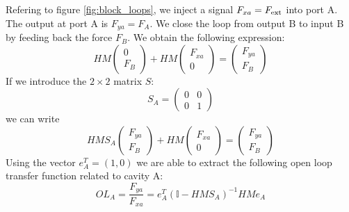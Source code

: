 Refering to figure \ref{fig:block_loops}, we inject a signal $F_{xa}=F_{\rm ext}$ into port A. The output at port A is $F_{ya}=F_A$. We close the loop from output B to input B by feeding back the force $F_B$.
We obtain the following expression:
\begin{equation}
HM
\left( \begin{array}{c}
0\\F_B
\end{array} \right)
+
HM
\left( \begin{array}{c}
F_{xa}\\0
\end{array} \right)
=
\left( \begin{array}{c}
F_{ya}\\F_B
\end{array} \right)
\end{equation}
If we introduce the $2\times2$ matrix $S$: 
\begin{equation}
S_A=
\left( \begin{array}{cc}
0 & 0\\
0 & 1
\end{array} \right)
\end{equation}
we can  write
\begin{equation}
HMS_A
\left( \begin{array}{c}
F_{ya}\\F_B
\end{array} \right)
+
HM
\left( \begin{array}{c}
F_{xa}\\0
\end{array} \right)
=
\left( \begin{array}{c}
F_{ya}\\F_B
\end{array} \right)
\end{equation}
Using the vector $e_A^{T}=(1,0)$ we are able to extract the following open loop
transfer function related to cavity A:
\begin{equation}
OL_{A}=\frac{F_{ya}}{F_{xa}}=e_A^{T}(\mathbb{I}-HMS_A)^{-1}HMe_A
\end{equation}

